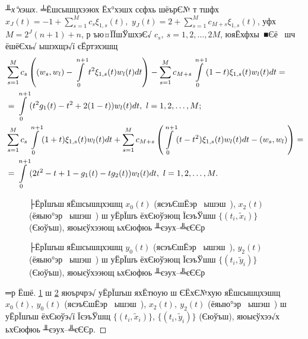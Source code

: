 \documentclass[12pt, a4paper, oneside]{article}
\begin{document}
\begin{proof}[╨х°хэшх] ╧Ёшсышцхээюх Ёх°хэшх сєфхь шёърЄ№ т тшфх $x_{J}(t)=-1+\sum\limits_{s=1}^M c_{s} {\xi}_{1,s}(t),$ $y_{J}(t)=2+\sum\limits_{s=1}^M c_{M+s} {\xi}_{1,s}(t)$, уфх $M=2^J(n+1)+n$, р ъю¤ЇЇшЎшхэЄ√ $c_s,~s=1,2,\dots, 2M$, юяЁхфхы ■Єё  шч ёшёЄхь√ ышэхщэ√ї єЁртэхэшщ
\begin{align}
&\sum\limits_{s=1}^M c_s\left((w_s,w_l)-\int\limits_{0}^{n+1}t^2{\xi}_{1,s}(t)w_l(t)dt\right)-\sum\limits_{s=1}^M c_{M+s}\int\limits_0^{n+1}(1-t){\xi}_{1,s}(t)w_l(t)dt=\notag\\
&=\int\limits_0^{n+1}(t^2g_1(t)-t^2+2(1-t))w_l(t)dt,~l=1,2,\dots,M;\notag\\
&\sum\limits_{s=1}^M c_s\int\limits_{0}^{n+1}(1+t){\xi}_{1,s}(t)w_l(t)dt+\sum\limits_{s=1}^M c_{M+s}\left(\int\limits_0^{n+1}(t-t^2){\xi}_{1,s}(t)w_l(t)dt-(w_s,w_l)\right)=\notag\\
&=\int\limits_0^{n+1}(2t^2-t+1-g_1(t)-tg_2(t))w_l(t)dt,~l=1,2,\dots,M.\notag
\end{align}
\begin{figure}[h]
\caption{├ЁрЇшъш яЁшсышцхэшщ $x_0(t)$ (яєэъЄшЁэр  ышэш ), $x_2(t)$ (ёяыю°эр  ышэш ) ш уЁрЇшъ ёхЄюўэющ ЇєэъЎшш $\{(t_i,\tilde{x}_i)\}$ (Єюўъш), яюыєўхээющ ьхЄюфюь ╨єэух--╩єЄЄр}
\label{sx}
\end{figure}
\begin{figure}[h]
\caption{├ЁрЇшъш яЁшсышцхэшщ $y_0(t)$ (яєэъЄшЁэр  ышэш ), $y_2(t)$ (ёяыю°эр  ышэш ) ш уЁрЇшъ ёхЄюўэющ ЇєэъЎшш $\{(t_i,\tilde{y}_i)\}$ (Єюўъш), яюыєўхээющ ьхЄюфюь ╨єэух--╩єЄЄр}
\label{sy}
\end{figure}
═р Ёшё. \ref{sx} ш \ref{sy} яюърчрэ√ уЁрЇшъш яхЁтюую ш ЄЁхЄ№хую яЁшсышцхэшщ $x_0(t),~y_0(t)$ (яєэъЄшЁэр  ышэш ), $x_2(t),~y_2(t)$ (ёяыю°эр  ышэш ) ш уЁрЇшъш ёхЄюўэ√ї ЇєэъЎшщ $\{(t_i,\tilde{x}_i)\}$, $\{(t_i,\tilde{y}_i)\}$ (Єюўъш), яюыєўхээ√х ьхЄюфюь ╨єэух--╩єЄЄр.
\end{proof}
\end{document}
